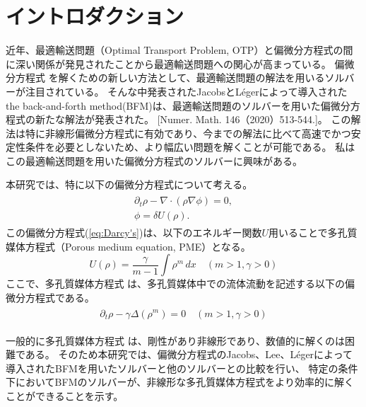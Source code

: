 \chapter{イントロダクション} \label{ch:intro}

近年、最適輸送問題（Optimal Transport Problem, OTP）と偏微分方程式の間に深い関係が発見されたことから最適輸送問題への関心が高まっている。
偏微分方程式 を解くための新しい方法として、最適輸送問題の解法を用いるソルバーが注目されている。
そんな中発表されたJacobsとLégerによって導入された the back-and-forth method(BFM)は、最適輸送問題のソルバーを用いた偏微分方程式の新たな解法が発表された。 [Numer. Math. 146（2020）513-544.]。
この解法は特に非線形偏微分方程式に有効であり、今までの解法に比べて高速でかつ安定性条件を必要としないため、より幅広い問題を解くことが可能である。
私はこの最適輸送問題を用いた偏微分方程式のソルバーに興味がある。

本研究では、特に以下の偏微分方程式について考える。
\begin{align}
    \begin{split}
        \label{eq:Darcy's}
        \partial_t \rho - \nabla \cdot (\rho \nabla \phi) = 0, \\
        \phi = \delta U(\rho).
    \end{split}
\end{align}
この偏微分方程式(\ref{eq:Darcy's})は、以下のエネルギー関数$U$用いることで多孔質媒体方程式（Porous medium equation, PME）となる。
$$
    U(\rho) = \frac{\gamma}{m - 1} \int \rho^m \,dx \quad(m > 1, \gamma > 0)
$$
ここで、多孔質媒体方程式 は、多孔質媒体中での流体流動を記述する以下の偏微分方程式である。
\begin{align}
    \begin{split}
        \label{eq:PME}
        \partial_t \rho - \gamma\Delta(\rho^m) = 0  \quad(m > 1, \gamma > 0)
    \end{split}
\end{align}

一般的に多孔質媒体方程式 は、剛性があり非線形であり、数値的に解くのは困難である。
そのため本研究では、偏微分方程式のJacobs、Lee、Légerによって導入されたBFMを用いたソルバーと他のソルバーとの比較を行い、
特定の条件下においてBFMのソルバーが、非線形な多孔質媒体方程式をより効率的に解くことができることを示す。


